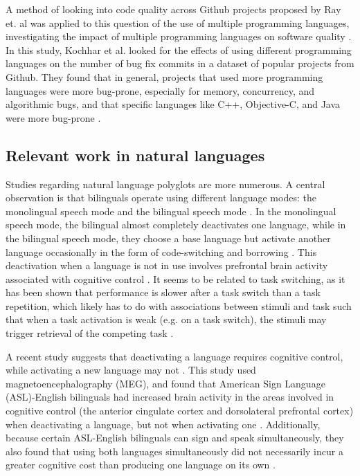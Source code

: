 \documentclass[a4paper,UKenglish,cleveref, autoref]{oasics-v2019}
\begin{document}
A method of looking into code quality across Github projects proposed by Ray et. al \cite{pl0026} was applied to this question of the use of multiple  programming languages, investigating the impact of multiple programming languages on software quality \cite{pl0025}. In this study, Kochhar et al. looked for the effects of using different programming languages on the number of bug fix commits in a dataset of popular projects from Github. They found that in general, projects that used more programming languages were more bug-prone, especially for memory, concurrency, and algorithmic bugs, and that specific languages like C++, Objective-C, and Java were more bug-prone \cite{pl0025}.


\subsection{Relevant work in natural languages}
Studies regarding natural language polyglots are more numerous. A central observation is that bilinguals operate using different language modes: the monolingual speech mode and the bilingual speech mode \cite{pl0046}. In the monolingual speech mode, the bilingual almost completely deactivates one language, while in the bilingual speech mode, they choose a base language but activate another language occasionally in the form of code-switching and borrowing \cite{pl0046}. This deactivation when a language is not in use involves prefrontal brain activity associated with cognitive control \cite{pl0048}. It seems to be related to task switching, as it has been shown that performance is slower after a task switch than a task repetition, which likely has to do with associations between stimuli and task such that when a task activation is weak (e.g. on a task switch), the stimuli may trigger retrieval of the competing task \cite{pl0031}. 

A recent study suggests that deactivating a language requires cognitive control, while activating a new language may not \cite{pl0029}. This study used magnetoencephalography (MEG), and found that American Sign Language (ASL)-English bilinguals had increased brain activity in the areas involved in cognitive control (the anterior cingulate cortex and dorsolateral prefrontal cortex) when deactivating a language, but not when activating one \cite{pl0029}. Additionally, because certain ASL-English bilinguals can sign and speak simultaneously, they also found that using both languages simultaneously did not necessarily incur a greater cognitive cost than producing one language on its own \cite{pl0029}. 
\end{document}
